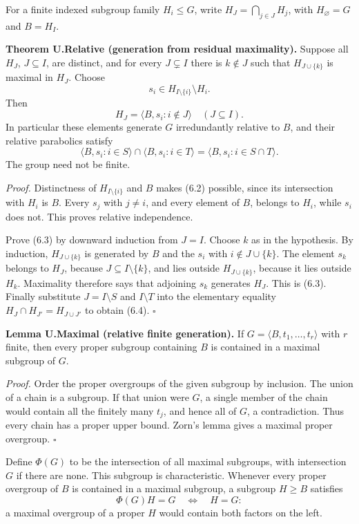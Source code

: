 \documentclass[
  11pt,
  a4paper,
]{article}
\newcounter{none} %
\begin{document}
For a finite indexed subgroup family \(H_i\leq G\), write
\(H_J=\bigcap_{j\in J}H_j\), with \(H_\varnothing=G\) and \(B=H_I\).

\textbf{Theorem U.Relative (generation from residual maximality).}
Suppose all \(H_J\), \(J\subseteq I\), are distinct, and for every
\(J\subsetneq I\) there is \(k\notin J\) such that \(H_{J\cup\{k\}}\) is
maximal in \(H_J\). Choose \[
s_i\in H_{I\setminus\{i\}}\setminus H_i.
\tag{6.2}
\] Then \[
H_J=\langle B,s_i:i\notin J\rangle\quad(J\subseteq I).
\tag{6.3}
\] In particular these elements generate \(G\) irredundantly relative to
\(B\), and their relative parabolics satisfy \[
\langle B,s_i:i\in S\rangle\cap\langle B,s_i:i\in T\rangle
=\langle B,s_i:i\in S\cap T\rangle.
\tag{6.4}
\] The group need not be finite.

\emph{Proof.} Distinctness of \(H_{I\setminus\{i\}}\) and \(B\) makes
(6.2) possible, since its intersection with \(H_i\) is \(B\). Every
\(s_j\) with \(j\ne i\), and every element of \(B\), belongs to \(H_i\),
while \(s_i\) does not. This proves relative independence.

Prove (6.3) by downward induction from \(J=I\). Choose \(k\) as in the
hypothesis. By induction, \(H_{J\cup\{k\}}\) is generated by \(B\) and
the \(s_i\) with \(i\notin J\cup\{k\}\). The element \(s_k\) belongs to
\(H_J\), because \(J\subseteq I\setminus\{k\}\), and lies outside
\(H_{J\cup\{k\}}\), because it lies outside \(H_k\). Maximality
therefore says that adjoining \(s_k\) generates \(H_J\). This is (6.3).
Finally substitute \(J=I\setminus S\) and \(I\setminus T\) into the
elementary equality \(H_J\cap H_{J'}=H_{J\cup J'}\) to obtain (6.4).
\(\square\)

\textbf{Lemma U.Maximal (relative finite generation).} If
\(G=\langle B,t_1,\ldots,t_r\rangle\) with \(r\) finite, then every
proper subgroup containing \(B\) is contained in a maximal subgroup of
\(G\).

\emph{Proof.} Order the proper overgroups of the given subgroup by
inclusion. The union of a chain is a subgroup. If that union were \(G\),
a single member of the chain would contain all the finitely many
\(t_j\), and hence all of \(G\), a contradiction. Thus every chain has a
proper upper bound. Zorn's lemma gives a maximal proper overgroup.
\(\square\)

Define \(\Phi(G)\) to be the intersection of all maximal subgroups, with
intersection \(G\) if there are none. This subgroup is characteristic.
Whenever every proper overgroup of \(B\) is contained in a maximal
subgroup, a subgroup \(H\geq B\) satisfies \[
\Phi(G)H=G\quad\Longleftrightarrow\quad H=G:
\tag{6.5}
\] a maximal overgroup of a proper \(H\) would contain both factors on
the left.
\end{document}
